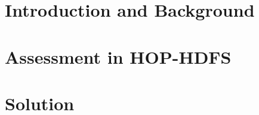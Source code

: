 \documentclass[a4paper,11pt,twoside,onecolumn,final,openright]{book}
\begin{document}


\pagestyle{headings}




\part{Introduction and Background}
\thispagestyle{empty}
\thispagestyle{empty}

\newpage
\thispagestyle{empty}


     


\part{Assessment in HOP-HDFS}
\thispagestyle{empty}
\thispagestyle{empty}

\newpage
\thispagestyle{empty}





\part{Solution}
\thispagestyle{empty}
\thispagestyle{empty}
\end{document}
